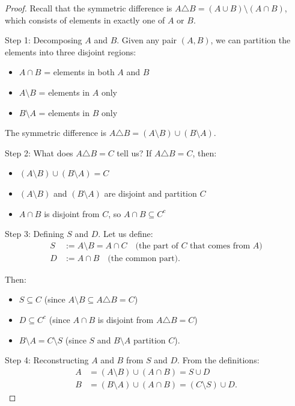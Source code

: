 \documentclass[11pt]{amsart}
\begin{document}
\begin{proof}
Recall that the symmetric difference is $A \triangle B = (A \cup B) \setminus (A \cap B)$, which consists of elements in exactly one of $A$ or $B$.

Step 1: Decomposing $A$ and $B$.  Given any pair $(A, B)$, we can partition the elements into three disjoint regions:
\begin{itemize}
    \item $A \cap B$ = elements in both $A$ and $B$
    \item $A \setminus B$ = elements in $A$ only
    \item $B \setminus A$ = elements in $B$ only
\end{itemize}
The symmetric difference is $A \triangle B = (A \setminus B) \cup (B \setminus A)$.

Step 2: What does $A \triangle B = C$ tell us?  If $A \triangle B = C$, then:
\begin{itemize}
    \item $(A \setminus B) \cup (B \setminus A) = C$
    \item $(A \setminus B)$ and $(B \setminus A)$ are disjoint and partition $C$
    \item $A \cap B$ is disjoint from $C$, so $A \cap B \subseteq C^c$
\end{itemize}

Step 3: Defining $S$ and $D$.  Let us define:
\begin{align*}
S &:= A \setminus B = A \cap C \quad \text{(the part of $C$ that comes from $A$)} \\
D &:= A \cap B \quad \text{(the common part)}.
\end{align*}

Then:
\begin{itemize}
    \item $S \subseteq C$ (since $A \setminus B \subseteq A \triangle B = C$)
    \item $D \subseteq C^c$ (since $A \cap B$ is disjoint from $A \triangle B = C$)
    \item $B \setminus A = C \setminus S$ (since $S$ and $B \setminus A$ partition $C$).
\end{itemize}

Step 4: Reconstructing $A$ and $B$ from $S$ and $D$.  From the definitions:
\begin{align*}
A &= (A \setminus B) \cup (A \cap B) = S \cup D \\
B &= (B \setminus A) \cup (A \cap B) = (C \setminus S) \cup D.
\end{align*}


\end{proof}
\end{document}
